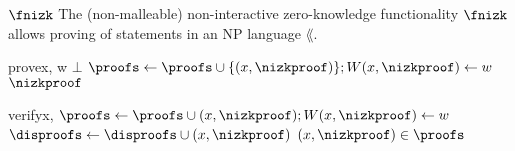 \begin{functionality}{$\fnizk$}
    The (non-malleable) non-interactive zero-knowledge functionality
    $\fnizk$ allows proving of statements in an NP language $\lang$.
    \begin{statedecl}
    \end{statedecl}
    \begin{receive}{prove}{x, w}
            \State \Return $\bot$
        \EndIf
        \State \Let $\proofs \gets \proofs \cup \{(x, \nizkproof)\}; W(x,
          \nizkproof) \gets w$
        \State \Return $\nizkproof$
    \end{receive}
    \begin{receive}{verify}{x, \nizkproof}
            \State {}
                \State \Let $\proofs \gets \proofs \cup (x, \nizkproof); W(x,
                  \nizkproof) \gets w$
              \Else
                \State \Let $\disproofs \gets \disproofs \cup (x, \nizkproof)$
              \EndIf
            \EndIf
        \EndIf
        \State \Return $(x, \nizkproof) \in \proofs$
    \end{receive}
\end{functionality}

